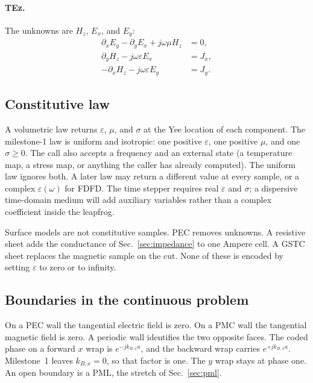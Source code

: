 \documentclass[11pt,a4paper]{article}
\numberwithin{equation}{section}
\begin{document}
\paragraph{TEz.}
The unknowns are $H_z$, $E_x$, and $E_y$:
\begin{align}
\partial_x E_y - \partial_y E_x + j\omega\mu H_z &= 0, \label{eq:te-hz}\\
\partial_y H_z - j\omega\varepsilon E_x &= J_x, \label{eq:te-ex}\\
-\partial_x H_z - j\omega\varepsilon E_y &= J_y. \label{eq:te-ey}
\end{align}

\subsection{Constitutive law}
\label{sec:constitutive}

A volumetric law returns $\varepsilon$, $\mu$, and $\sigma$ at the Yee location
of each component. The milestone-1 law is uniform and isotropic: one positive
$\varepsilon$, one positive $\mu$, and one $\sigma\ge 0$. The call also accepts
a frequency and an external state (a temperature map, a stress map, or
anything the caller has already computed). The uniform law ignores both. A
later law may return a different value at every sample, or a complex
$\varepsilon(\omega)$ for FDFD. The time stepper requires real $\varepsilon$
and $\sigma$; a dispersive time-domain medium will add auxiliary variables
rather than a complex coefficient inside the leapfrog.

Surface models are not constitutive samples. PEC removes unknowns. A
resistive sheet adds the conductance of Sec.~\ref{sec:impedance} to one
Ampere cell. A GSTC sheet replaces the magnetic sample on the cut. None of
these is encoded by setting $\varepsilon$ to zero or to infinity.

\subsection{Boundaries in the continuous problem}
\label{sec:continuous-bc}

On a PEC wall the tangential electric field is zero. On a PMC wall the
tangential magnetic field is zero. A periodic wall identifies the two opposite
faces. The coded phase on a forward $x$ wrap is $e^{-j k_{B,x} a}$, and the
backward wrap carries $e^{+j k_{B,x} a}$. Milestone~1 leaves $k_{B,x}=0$, so
that factor is one. The $y$ wrap stays at phase one. An open boundary is a PML,
the stretch of Sec.~\ref{sec:pml}.
\end{document}
